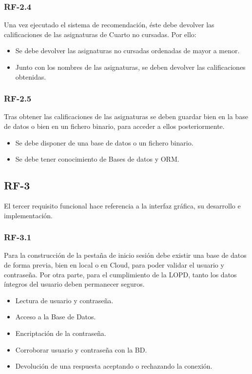 \subsubsection{RF-2.4}
Una vez ejecutado el sistema de recomendación, éste debe devolver   las calificaciones de las asignaturas de Cuarto no cursadas. Por ello: 
\begin{itemize}
\item Se debe devolver las asignaturas no cursadas ordenadas de mayor a menor. 
\item Junto con los nombres de las asignaturas, se deben devolver las calificaciones obtenidas. 
\end{itemize}

\subsubsection{RF-2.5}
Tras obtener las calificaciones de las asignaturas se deben guardar bien en la base de datos o bien en un fichero binario, para acceder a ellos posteriormente. 
\begin{itemize}
\item Se debe disponer de una base de datos o un fichero binario. 
\item Se debe tener conocimiento de Bases de datos y ORM.  
\end{itemize}


\subsection{RF-3}
El tercer requisito funcional hace referencia a la interfaz gráfica, su desarrollo e implementación. 
\subsubsection{RF-3.1}
Para la construcción de la pestaña de inicio sesión debe existir una base de datos de forma previa, bien en local o en Cloud, para poder validar el usuario y contraseña. Por otra parte, para el cumplimiento de la LOPD, tanto los datos íntegros del usuario deben permanecer seguros. 
\begin{itemize}
\item Lectura de usuario y contraseña. 
\item Acceso a la Base de Datos. 
\item Encriptación de la contraseña. 
\item Corroborar usuario y contraseña con la BD. 
\item Devolución de una respuesta aceptando o rechazando la conexión. 
\end{itemize} 

